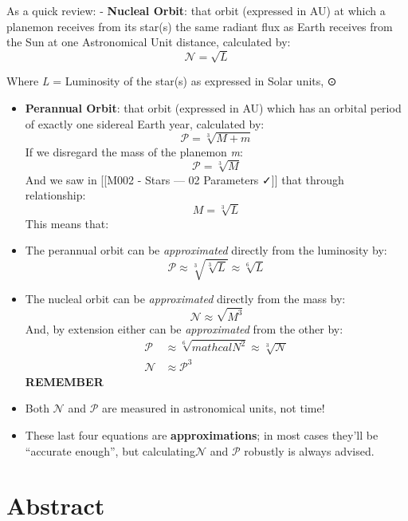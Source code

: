 \documentclass[
  letterpaper,
]{book}
\providecommand{\tightlist}{%
  \setlength{\itemsep}{0pt}\setlength{\parskip}{0pt}}
\begin{document}
As a quick review: - \textbf{Nucleal Orbit}: that orbit (expressed in
AU) at which a planemon receives from its star(s) the same radiant flux
as Earth receives from the Sun at one Astronomical Unit distance,
calculated by: \[
    \mathcal{N} = \sqrt{L}
\]

Where \emph{L} = Luminosity of the star(s) as expressed in Solar units,
⊙

\begin{itemize}
\tightlist
\item
  \textbf{Perannual Orbit}: that orbit (expressed in AU) which has an
  orbital period of exactly one sidereal Earth year, calculated by: \[
  \mathcal{P} = \sqrt[3]{M+m}
  \] If we disregard the mass of the planemon \emph{m}: \[
  \mathcal{P} = \sqrt[3]{M}
  \] And we saw in {[}{[}M002 - Stars --- 02 Parameters ✓{]}{]} that
  through relationship: \[
  M = \sqrt[3]{L}
  \] This means that:
\item
  The perannual orbit can be \emph{approximated} directly from the
  luminosity by: \[
  \mathcal{P} \approx \sqrt[3]{\sqrt[3]{L}} \approx \sqrt[6]{L}
  \]
\item
  The nucleal orbit can be \emph{approximated} directly from the mass
  by: \[
  \mathcal{N} \approx \sqrt{M^3}
  \] And, by extension either can be \emph{approximated} from the other
  by: \[
  \begin{align}
  \mathcal{P} &\approx \sqrt[6]{mathcal{N}^2} \approx \sqrt[3]{\mathcal{N}} \\
  \mathcal{N} &\approx \mathcal{P}^3
  \end{align}
  \] \textbf{REMEMBER}
\item
  Both \(\mathcal{N}\) and \(\mathcal{P}\) are measured in astronomical
  units, not time!
\item
  These last four equations are \textbf{approximations}; in most cases
  they'll be ``accurate enough'', but calculating\(\mathcal{N}\) and
  \(\mathcal{P}\) robustly is always advised.
\end{itemize}

\section{Abstract}\label{abstract-12}
\end{document}
